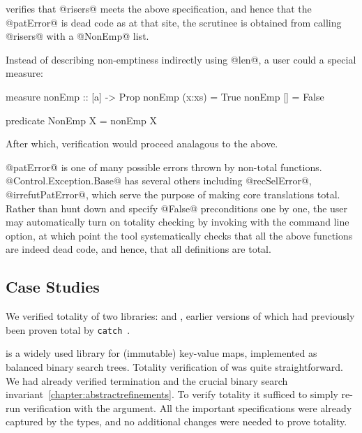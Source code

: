 \toolname verifies that @risers@ meets the above specification, 
and hence that the @patError@ is dead code as at that 
site, the scrutinee is obtained from calling @risers@ with a
@NonEmp@ list.

Instead of describing non-emptiness indirectly using @len@, a 
user could a special measure:
%
\begin{code}
  measure nonEmp  :: [a] -> Prop
    nonEmp (x:xs)   = True
    nonEmp []       = False

  predicate NonEmp X = nonEmp X
\end{code}
%
After which, verification would proceed analagous to the above.

@patError@ is one of many possible errors thrown by non-total functions.  
@Control.Exception.Base@ has several others including @recSelError@, @irrefutPatError@, \etc which serve the purpose of making 
core translations total.
%
Rather than hunt down and specify @False@ preconditions one
by one, the user may automatically turn on totality checking 
by invoking \toolname with the \cmdtotality command line option, 
at which point the tool systematically checks that all the above 
functions are indeed dead code, and hence, that all definitions are total.

\subsection{Case Studies}

We verified totality of two libraries: \lbhscolour and \lbmap, earlier versions
of which had previously been proven total by \texttt{catch}~\citep{catch}.

\mypara{\lbmap} 
is a widely used library for (immutable) key-value maps, implemented
as balanced binary search trees.
Totality verification of \lbmap was quite straightforward.
We had already verified termination and the crucial 
binary search invariant~\ref{chapter:abstractrefinements}. To verify 
totality it sufficed to simply re-run verification with
the \cmdtotality argument.
%
All the important specifications were already captured by the types, 
and no additional changes were needed to prove totality.
%
%

